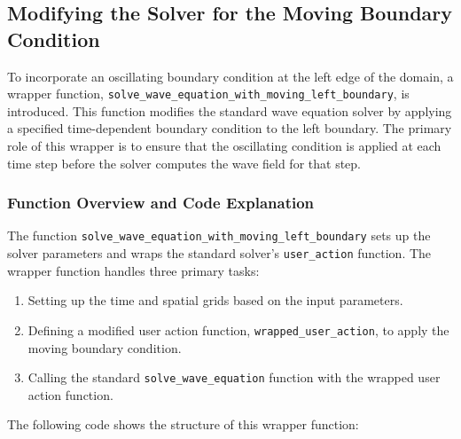 \documentclass{article}
\begin{document}
			\subsection{Modifying the Solver for the Moving Boundary Condition}
			
			To incorporate an oscillating boundary condition at the left edge of the domain, a wrapper function, \texttt{solve\_wave\_equation\_with\_moving\_left\_boundary}, is introduced. This function modifies the standard wave equation solver by applying a specified time-dependent boundary condition to the left boundary. The primary role of this wrapper is to ensure that the oscillating condition is applied at each time step before the solver computes the wave field for that step.
			
			\subsubsection{Function Overview and Code Explanation}
			
			The function \texttt{solve\_wave\_equation\_with\_moving\_left\_boundary} sets up the solver parameters and wraps the standard solver’s \texttt{user\_action} function. The wrapper function handles three primary tasks:
			\begin{enumerate}
				\item Setting up the time and spatial grids based on the input parameters.
				\item Defining a modified user action function, \texttt{wrapped\_user\_action}, to apply the moving boundary condition.
				\item Calling the standard \texttt{solve\_wave\_equation} function with the wrapped user action function.
			\end{enumerate}
			
			The following code shows the structure of this wrapper function:
			
\end{document}
